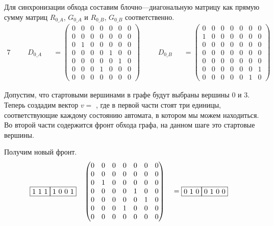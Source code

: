 \begin{example}
  Для синхронизации обхода составим блочно---диагональную матрицу как прямую сумму матриц $R_{0\_A}$, $G_{0\_A}$ и $R_{0\_B}$, $G_{0\_B}$ соответственно.
  \begin{alignat*}{7}
    & &&D_{0\_A} &&= \begin{pmatrix}
      0 & 0 & 0 & 0 & 0 & 0 & 0 \\
      0 & 0 & 0 & 0 & 0 & 0 & 0 \\
      0 & 1 & 0 & 0 & 0 & 0 & 0 \\
      0 & 0 & 0 & 0 & 1 & 0 & 0 \\
      0 & 0 & 0 & 0 & 0 & 1 & 0 \\
      0 & 0 & 0 & 1 & 0 & 0 & 0 \\
      0 & 0 & 0 & 0 & 0 & 0 & 0 
      \end{pmatrix} \ \ \ \ &&D_{0\_B} &&= \begin{pmatrix}
        0 & 0 & 0 & 0 & 0 & 0 & 0 \\
        1 & 0 & 0 & 0 & 0 & 0 & 0 \\
        0 & 0 & 0 & 0 & 0 & 0 & 0 \\
        0 & 0 & 0 & 0 & 0 & 0 & 0 \\
        0 & 0 & 0 & 0 & 0 & 0 & 0 \\
        0 & 0 & 0 & 0 & 0 & 0 & 1 \\
        0 & 0 & 0 & 0 & 0 & 1 & 0 
        \end{pmatrix}
    \end{alignat*}

  Допустим, что стартовыми вершинами в графе будут выбраны вершины 0 и 3.
  Теперь создадим вектор $v = $  , где в первой части стоят три единицы, соответствующие каждому состоянию автомата, в котором мы можем находиться. Во второй части содержится фронт обхода графа, на данном шаге это стартовые вершины.
  
  Получим новый фронт.
  \begin{alignat*}{7}
    & \begin{matrix}
      \fbox{1 1 1} \fbox{1 0 0 1}
      \end{matrix}  && \begin{pmatrix}
        0 & 0 & 0 & 0 & 0 & 0 & 0 \\
        0 & 0 & 0 & 0 & 0 & 0 & 0 \\
        0 & 1 & 0 & 0 & 0 & 0 & 0 \\
        0 & 0 & 0 & 0 & 1 & 0 & 0 \\
        0 & 0 & 0 & 0 & 0 & 1 & 0 \\
        0 & 0 & 0 & 1 & 0 & 0 & 0 \\
        0 & 0 & 0 & 0 & 0 & 0 & 0 
        \end{pmatrix} &&= \begin{matrix}
          \fbox{0 1 0} \fbox{0 1 0 0} 
          \end{matrix}
    \end{alignat*}


\end{example}

